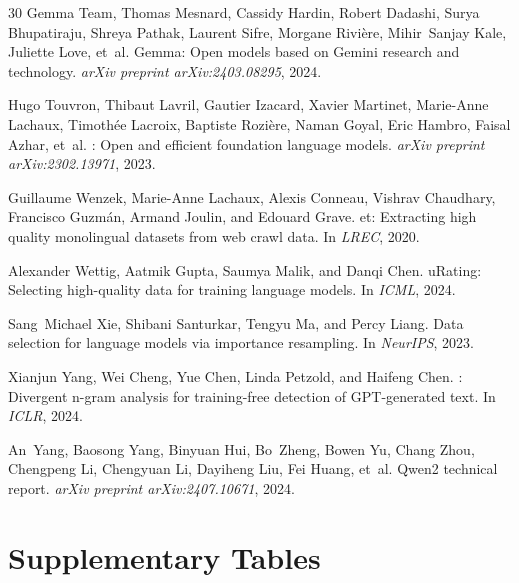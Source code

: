 \documentclass[11pt,a4paper]{article}
\begin{document}
\begin{thebibliography}{30}
Gemma Team, Thomas Mesnard, Cassidy Hardin, Robert Dadashi, Surya Bhupatiraju, Shreya Pathak, Laurent Sifre, Morgane Rivi{\`e}re, Mihir~Sanjay Kale, Juliette Love, et~al.
\newblock Gemma: Open models based on {G}emini research and technology.
\newblock \emph{arXiv preprint arXiv:2403.08295}, 2024.

Hugo Touvron, Thibaut Lavril, Gautier Izacard, Xavier Martinet, Marie-Anne Lachaux, Timoth{\'e}e Lacroix, Baptiste Rozi{\`e}re, Naman Goyal, Eric Hambro, Faisal Azhar, et~al.
: Open and efficient foundation language models.
\newblock \emph{arXiv preprint arXiv:2302.13971}, 2023.

Guillaume Wenzek, Marie-Anne Lachaux, Alexis Conneau, Vishrav Chaudhary, Francisco Guzm{\'a}n, Armand Joulin, and Edouard Grave.
et: Extracting high quality monolingual datasets from web crawl data.
\newblock In \emph{LREC}, 2020.

Alexander Wettig, Aatmik Gupta, Saumya Malik, and Danqi Chen.
u{R}ating: Selecting high-quality data for training language models.
\newblock In \emph{ICML}, 2024.

Sang~Michael Xie, Shibani Santurkar, Tengyu Ma, and Percy Liang.
\newblock Data selection for language models via importance resampling.
\newblock In \emph{NeurIPS}, 2023.

Xianjun Yang, Wei Cheng, Yue Chen, Linda Petzold, and Haifeng Chen.
: Divergent n-gram analysis for training-free detection of {GPT}-generated text.
\newblock In \emph{ICLR}, 2024.

An~Yang, Baosong Yang, Binyuan Hui, Bo~Zheng, Bowen Yu, Chang Zhou, Chengpeng Li, Chengyuan Li, Dayiheng Liu, Fei Huang, et~al.
\newblock Qwen2 technical report.
\newblock \emph{arXiv preprint arXiv:2407.10671}, 2024.

\end{thebibliography}

\appendix

\section{Supplementary Tables}
\end{document}
